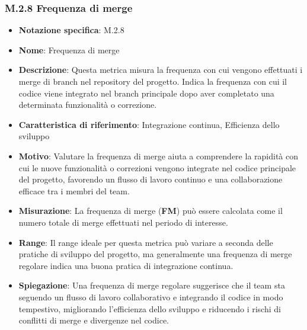 \subsubsection{M.2.8 Frequenza di merge}
\begin{itemize}
    \item \textbf{Notazione specifica}: M.2.8
    \item \textbf{Nome}: Frequenza di merge
    \item \textbf{Descrizione}: Questa metrica misura la frequenza con cui vengono effettuati i merge di branch nel repository del progetto. Indica la frequenza con cui il codice viene integrato nel branch principale dopo aver completato una determinata funzionalità o correzione.
    \item \textbf{Caratteristica di riferimento}: Integrazione continua, Efficienza dello sviluppo
    \item \textbf{Motivo}: Valutare la frequenza di merge aiuta a comprendere la rapidità con cui le nuove funzionalità o correzioni vengono integrate nel codice principale del progetto, favorendo un flusso di lavoro continuo e una collaborazione efficace tra i membri del team.
    \item \textbf{Misurazione}: La frequenza di merge (\textbf{FM}) può essere calcolata come il numero totale di merge effettuati nel periodo di interesse.
    \item \textbf{Range}: Il range ideale per questa metrica può variare a seconda delle pratiche di sviluppo del progetto, ma generalmente una frequenza di merge regolare indica una buona pratica di integrazione continua.
    \item \textbf{Spiegazione}: Una frequenza di merge regolare suggerisce che il team sta seguendo un flusso di lavoro collaborativo e integrando il codice in modo tempestivo, migliorando l'efficienza dello sviluppo e riducendo i rischi di conflitti di merge e divergenze nel codice.
\end{itemize}

